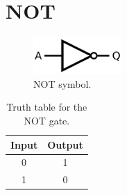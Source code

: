 \section{NOT}
	\begin{figure}[H]
	    \centering
	    \includegraphics[width=0.3\textwidth]{figures/symbols/NOT.png}
	    \caption{NOT symbol.}
	    \label{fig:NOT_sym} 
	\end{figure}

    \begin{table}[ht]
    \centering
    \begin{tabular}{|c|c|}
        \hline
        Input & Output \\
        \hline
        0 & 1 \\
        1 & 0 \\
        \hline
    \end{tabular}
    \caption{Truth table for the NOT gate.}
    \end{table}